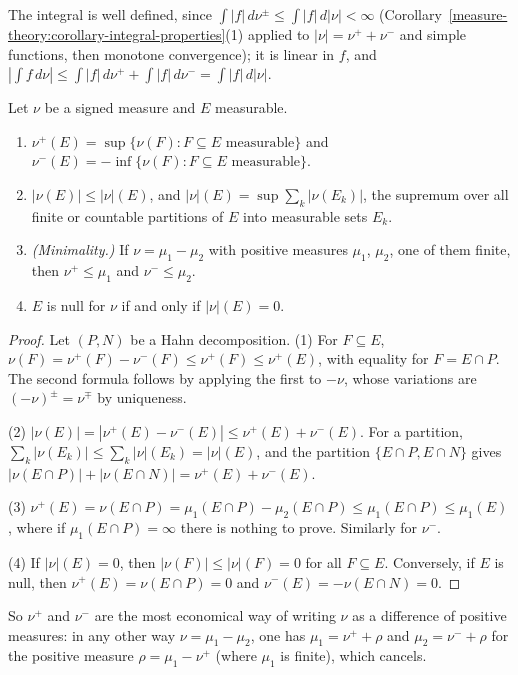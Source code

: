 The integral is well defined, since $\int|f|\,d\nu^\pm \leq \int|f|\,d|\nu| < \infty$ (Corollary~\ref{measure-theory:corollary-integral-properties}(1) applied to $|\nu| = \nu^+ + \nu^-$ and simple functions,
then monotone convergence); it is linear in $f$, and $|\int f\,d\nu| \leq \int|f|\,d\nu^+ + \int|f|\,d\nu^- = \int|f|\,d|\nu|$.

\begin{proposition}\label{signed-measures:proposition-variation-signed}
Let $\nu$ be a signed measure and $E$ measurable.
\begin{enumerate}
\item $\nu^+(E) = \sup\{\nu(F) : F \subseteq E \text{ measurable}\}$ and $\nu^-(E) = -\inf\{\nu(F) : F \subseteq E \text{ measurable}\}$.
\item $|\nu(E)| \leq |\nu|(E)$, and $|\nu|(E) = \sup\sum_k|\nu(E_k)|$, the supremum over all finite or countable partitions of $E$ into measurable sets $E_k$.
\item \emph{(Minimality.)} If $\nu = \mu_1 - \mu_2$ with positive measures $\mu_1$, $\mu_2$, one of them finite, then $\nu^+ \leq \mu_1$ and $\nu^- \leq \mu_2$.
\item $E$ is null for $\nu$ if and only if $|\nu|(E) = 0$.
\end{enumerate}
\end{proposition}

\begin{proof}
Let $(P, N)$ be a Hahn decomposition. (1) For $F \subseteq E$, $\nu(F) = \nu^+(F) - \nu^-(F) \leq \nu^+(F) \leq \nu^+(E)$, with equality for $F = E \cap P$. The second formula follows by applying
the first to $-\nu$, whose variations are $(-\nu)^\pm = \nu^\mp$ by uniqueness.

(2) $|\nu(E)| = |\nu^+(E) - \nu^-(E)| \leq \nu^+(E) + \nu^-(E)$. For a partition, $\sum_k|\nu(E_k)| \leq \sum_k|\nu|(E_k) = |\nu|(E)$, and the partition $\{E \cap P, E \cap N\}$ gives
$|\nu(E \cap P)| + |\nu(E \cap N)| = \nu^+(E) + \nu^-(E)$.

(3) $\nu^+(E) = \nu(E \cap P) = \mu_1(E \cap P) - \mu_2(E \cap P) \leq \mu_1(E \cap P) \leq \mu_1(E)$, where if $\mu_1(E \cap P) = \infty$ there is nothing to prove. Similarly for $\nu^-$.

(4) If $|\nu|(E) = 0$, then $|\nu(F)| \leq |\nu|(F) = 0$ for all $F \subseteq E$. Conversely, if $E$ is null, then $\nu^+(E) = \nu(E \cap P) = 0$ and $\nu^-(E) = -\nu(E \cap N) = 0$.
\end{proof}

So $\nu^+$ and $\nu^-$ are the most economical way of writing $\nu$ as a difference of positive measures: in any other way $\nu = \mu_1 - \mu_2$, one has $\mu_1 = \nu^+ + \rho$ and $\mu_2 = \nu^- + \rho$
for the positive measure $\rho = \mu_1 - \nu^+$ (where $\mu_1$ is finite), which cancels.

